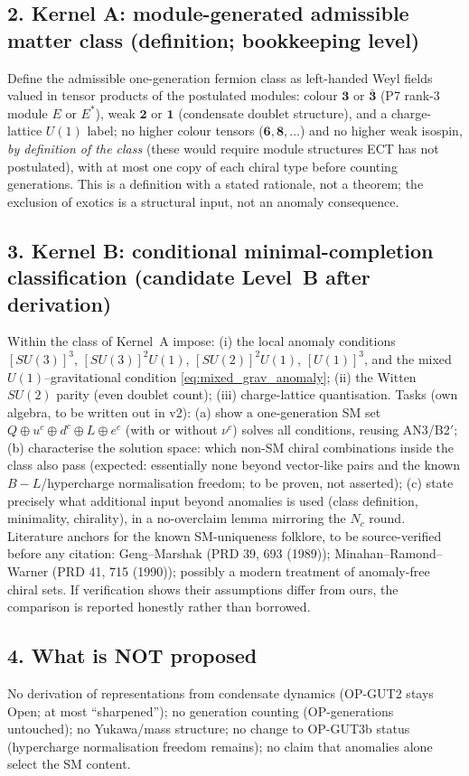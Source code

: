 \subsection*{2. Kernel A: module-generated admissible matter
class (definition; bookkeeping level)}
Define the admissible one-generation fermion class as left-handed
Weyl fields valued in tensor products of the postulated modules:
colour $\mathbf{3}$ or $\bar{\mathbf 3}$ (P7 rank-3 module $E$ or
$E^*$), weak $\mathbf{2}$ or $\mathbf 1$ (condensate doublet
structure), and a charge-lattice $U(1)$ label; no higher colour
tensors ($\mathbf 6,\mathbf 8,\dots$) and no higher weak isospin,
\emph{by definition of the class} (these would require module
structures ECT has not postulated), with at most one copy of each
chiral type before counting generations.
This is a definition with a stated rationale, not a theorem; the
exclusion of exotics is a structural input, not an anomaly
consequence.

\subsection*{3. Kernel B: conditional minimal-completion
classification (candidate Level~B after derivation)}
Within the class of Kernel~A impose:
(i) the local anomaly conditions $[SU(3)]^3$, $[SU(3)]^2U(1)$,
$[SU(2)]^2U(1)$, $[U(1)]^3$, and the mixed
$U(1)$--gravitational condition \eqref{eq:mixed_grav_anomaly};
(ii) the Witten $SU(2)$ parity (even doublet count);
(iii) charge-lattice quantisation.
Tasks (own algebra, to be written out in v2):
(a) show a one-generation SM set
$Q\oplus u^c\oplus d^c\oplus L\oplus e^c$ (with or without
$\nu^c$) solves all conditions, reusing AN3/B2$'$;
(b) characterise the solution space: which non-SM chiral
combinations inside the class also pass (expected: essentially
none beyond vector-like pairs and the known $B-L$/hypercharge
normalisation freedom; to be proven, not asserted);
(c) state precisely what additional input beyond anomalies is used
(class definition, minimality, chirality), in a no-overclaim lemma
mirroring the $N_c$ round.
Literature anchors for the known SM-uniqueness folklore, to be
source-verified before any citation: Geng--Marshak (PRD 39, 693
(1989)); Minahan--Ramond--Warner (PRD 41, 715 (1990)); possibly a
modern treatment of anomaly-free chiral sets.
If verification shows their assumptions differ from ours, the
comparison is reported honestly rather than borrowed.

\subsection*{4. What is NOT proposed}
No derivation of representations from condensate dynamics
(OP-GUT2 stays Open; at most ``sharpened'');
no generation counting (OP-generations untouched);
no Yukawa/mass structure; no change to OP-GUT3b status
(hypercharge normalisation freedom remains);
no claim that anomalies alone select the SM content.

